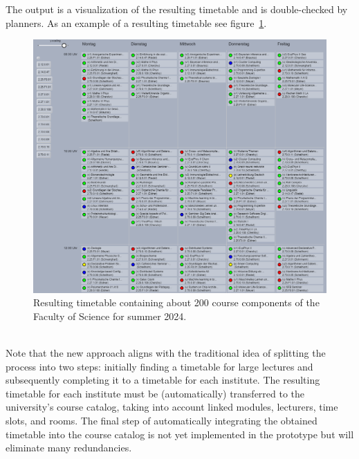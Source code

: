 \documentclass{easychair}
\begin{document}
  The output is a visualization of the resulting timetable and is double-checked by planners. 
  As an example of a resulting timetable see figure~\ref{fig:timetable}. 
  \begin{figure}
    \includegraphics[width=\linewidth]{timetable}
    \caption{Resulting timetable containing about 200 course components of the Faculty of Science for summer 2024.}
    \label{fig:timetable}
  \end{figure} \\
  Note that the new approach aligns with the traditional idea of splitting the process into two steps: initially finding a timetable for large lectures and subsequently completing it to a timetable for each institute.
  The resulting timetable for each institute must be (automatically) transferred to the university's course catalog, taking into account linked modules, lecturers, time slots, and rooms.
  The final step of automatically integrating the obtained timetable into the course catalog is not yet implemented in the prototype but will eliminate many redundancies.


\end{document}
